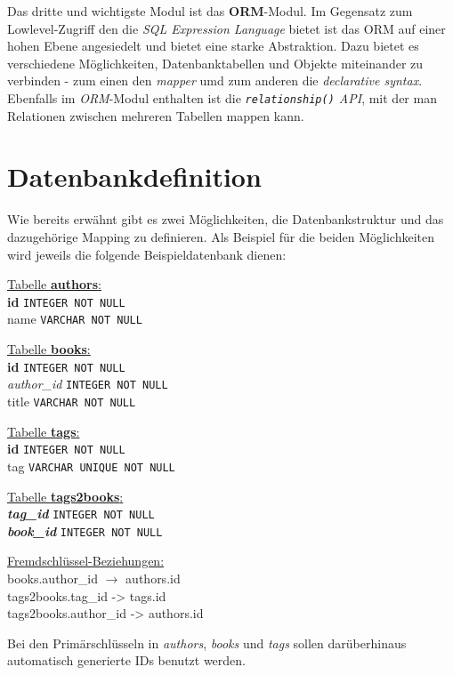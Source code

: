 Das dritte und wichtigste Modul ist das \textbf{ORM}-Modul. Im Gegensatz zum
Lowlevel-Zugriff den die \emph{SQL Expression Language} bietet ist das ORM auf
einer hohen Ebene angesiedelt und bietet eine starke Abstraktion. Dazu bietet es
verschiedene Möglichkeiten, Datenbanktabellen und Objekte miteinander zu
verbinden - zum einen den \emph{mapper} umd zum anderen die \emph{declarative
syntax}. Ebenfalls im \emph{ORM}-Modul enthalten ist die
\emph{\texttt{relationship()} API}, mit der man Relationen zwischen mehreren
Tabellen mappen kann.


\section{Datenbankdefinition}

Wie bereits erwähnt gibt es zwei Möglichkeiten, die Datenbankstruktur und das
dazugehörige Mapping zu definieren. Als Beispiel für die beiden Möglichkeiten
wird jeweils die folgende Beispieldatenbank dienen:

\underline{Tabelle \textbf{authors}:}\\
\textbf{id} \texttt{INTEGER NOT NULL}\\
name \texttt{VARCHAR NOT NULL}

\underline{Tabelle \textbf{books}:}\\
\textbf{id} \texttt{INTEGER NOT NULL}\\
\textit{author\_id} \texttt{INTEGER NOT NULL}\\
title \texttt{VARCHAR NOT NULL}

\underline{Tabelle \textbf{tags}:}\\
\textbf{id} \texttt{INTEGER NOT NULL}\\
tag \texttt{VARCHAR UNIQUE NOT NULL}

\underline{Tabelle \textbf{tags2books}:}\\
\textbf{\textit{tag\_id}} \texttt{INTEGER NOT NULL}\\
\textbf{\textit{book\_id}} \texttt{INTEGER NOT NULL}

\underline{Fremdschlüssel-Beziehungen:}\\
books.author\_id $\rightarrow$ authors.id\\
tags2books.tag\_id -> tags.id\\
tags2books.author\_id -> authors.id

Bei den Primärschlüsseln in \emph{authors}, \emph{books} und \emph{tags} sollen
darüberhinaus automatisch generierte IDs benutzt werden.


